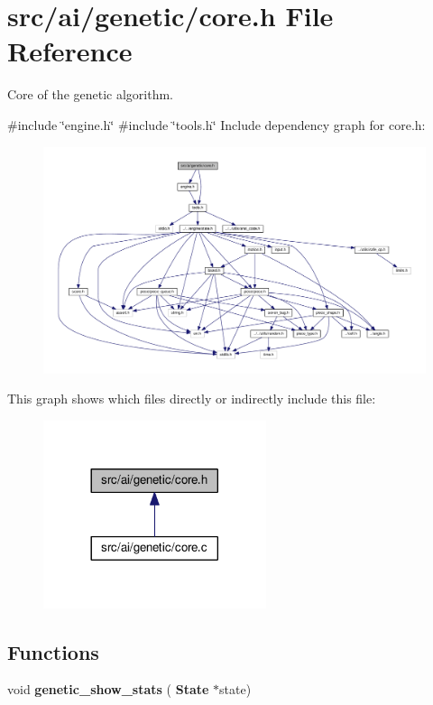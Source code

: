 \section{src/ai/genetic/core.h File Reference}
\label{core_8h}


Core of the genetic algorithm.  


{\ttfamily \#include \char`\"{}engine.\+h\char`\"{}}\newline
{\ttfamily \#include \char`\"{}tools.\+h\char`\"{}}\newline
Include dependency graph for core.\+h\+:
\nopagebreak
\begin{figure}[H]
\begin{center}
\leavevmode
\includegraphics[width=350pt]{core_8h__incl}
\end{center}
\end{figure}
This graph shows which files directly or indirectly include this file\+:
\nopagebreak
\begin{figure}[H]
\begin{center}
\leavevmode
\includegraphics[width=185pt]{core_8h__dep__incl}
\end{center}
\end{figure}
\subsection*{Functions}
\begin{DoxyCompactItemize}
\item 
void \textbf{ genetic\+\_\+show\+\_\+stats} (\textbf{ State} $\ast$state)
\end{DoxyCompactItemize}


